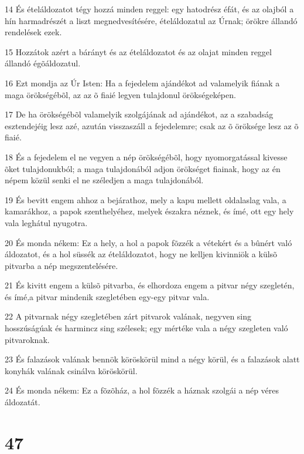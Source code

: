 \par 14 És ételáldozatot tégy hozzá minden reggel: egy hatodrész éfát, és az olajból a hín harmadrészét a liszt megnedvesítésére, ételáldozatul az Úrnak; örökre állandó rendelések ezek.
\par 15 Hozzátok azért a bárányt és az ételáldozatot és az olajat minden reggel állandó égõáldozatul.
\par 16 Ezt mondja az Úr Isten: Ha a fejedelem ajándékot ad valamelyik fiának a maga örökségébõl, az az õ fiaié legyen tulajdonul örökségeképen.
\par 17 De ha örökségébõl valamelyik szolgájának ad ajándékot, az a szabadság esztendejéig lesz azé, azután visszaszáll a fejedelemre; csak az õ öröksége lesz az õ fiaié.
\par 18 És a fejedelem el ne vegyen a nép örökségébõl, hogy nyomorgatással kivesse õket tulajdonukból; a maga tulajdonából adjon örökséget fiainak, hogy az én népem közül senki el ne széledjen a maga tulajdonából.
\par 19 És bevitt engem ahhoz a bejárathoz, mely a kapu mellett oldalaslag vala, a kamarákhoz, a papok szenthelyéhez, melyek északra néznek, és ímé, ott egy hely vala leghátul nyugotra.
\par 20 És monda nékem: Ez a hely, a hol a papok fõzzék a vétekért és a bûnért való áldozatot, és a hol süssék az ételáldozatot, hogy ne kelljen kivinniök a külsõ pitvarba a nép megszentelésére.
\par 21 És kivitt engem a külsõ pitvarba, és elhordoza engem a pitvar négy szegletén, és ímé,a pitvar mindenik szegletében egy-egy pitvar vala.
\par 22 A pitvarnak négy szegletében zárt pitvarok valának, negyven sing hosszúságúak és harmincz sing szélesek; egy mértéke vala a négy szegleten való pitvaroknak.
\par 23 És falazások valának bennök köröskörül mind a négy körül, és a falazások alatt konyhák valának csinálva köröskörül.
\par 24 És monda nékem: Ez a fõzõház, a hol fõzzék a háznak szolgái a nép véres áldozatát.

\chapter{47}

